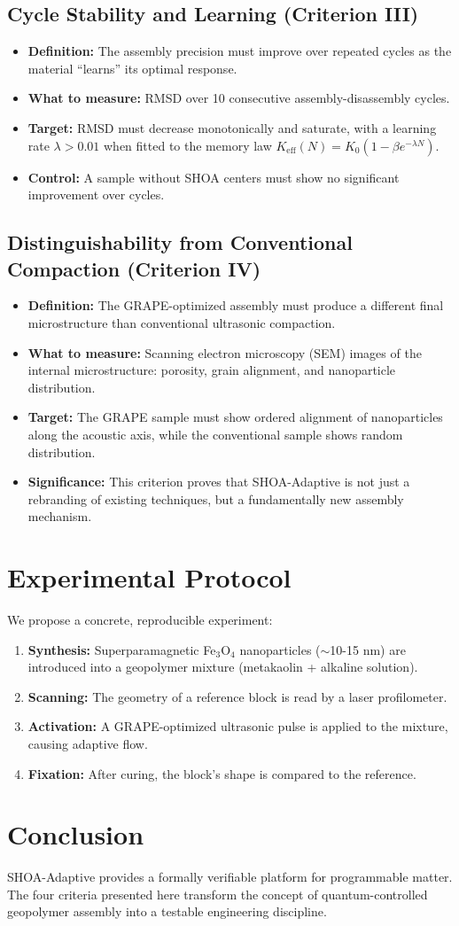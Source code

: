 \documentclass[12pt]{article}
\begin{document}
\subsection{Cycle Stability and Learning (Criterion III)}
\begin{itemize}
    \item \textbf{Definition:} The assembly precision must improve over repeated cycles as the material ``learns'' its optimal response.
    \item \textbf{What to measure:} RMSD over 10 consecutive assembly-disassembly cycles.
    \item \textbf{Target:} RMSD must decrease monotonically and saturate, with a learning rate $\lambda > 0.01$ when fitted to the memory law $K_{\text{eff}}(N) = K_0 (1 - \beta e^{-\lambda N})$.
    \item \textbf{Control:} A sample without SHOA centers must show no significant improvement over cycles.
\end{itemize}

\subsection{Distinguishability from Conventional Compaction (Criterion IV)}
\begin{itemize}
    \item \textbf{Definition:} The GRAPE-optimized assembly must produce a different final microstructure than conventional ultrasonic compaction.
    \item \textbf{What to measure:} Scanning electron microscopy (SEM) images of the internal microstructure: porosity, grain alignment, and nanoparticle distribution.
    \item \textbf{Target:} The GRAPE sample must show ordered alignment of nanoparticles along the acoustic axis, while the conventional sample shows random distribution.
    \item \textbf{Significance:} This criterion proves that SHOA-Adaptive is not just a rebranding of existing techniques, but a fundamentally new assembly mechanism.
\end{itemize}

\section{Experimental Protocol}
We propose a concrete, reproducible experiment:
\begin{enumerate}
    \item \textbf{Synthesis:} Superparamagnetic Fe$_3$O$_4$ nanoparticles ($\sim$10-15 nm) are introduced into a geopolymer mixture (metakaolin + alkaline solution).
    \item \textbf{Scanning:} The geometry of a reference block is read by a laser profilometer.
    \item \textbf{Activation:} A GRAPE-optimized ultrasonic pulse is applied to the mixture, causing adaptive flow.
    \item \textbf{Fixation:} After curing, the block's shape is compared to the reference.
\end{enumerate}

\section{Conclusion}
SHOA-Adaptive provides a formally verifiable platform for programmable matter. The four criteria presented here transform the concept of quantum-controlled geopolymer assembly into a testable engineering discipline.
\end{document}
